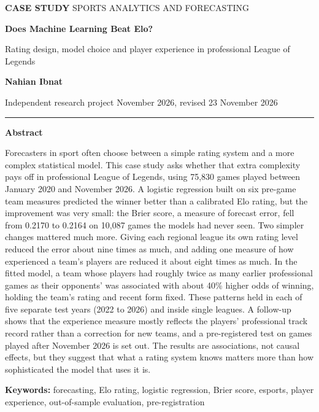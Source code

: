 \documentclass[12pt,a4paper]{article}
\newcommand{\keybox}[2]{%
  \par\noindent\colorbox{boxbg}{\parbox{\dimexpr\linewidth-2\fboxsep}{\vspace{0.3em}%
  {\sffamily\small\bfseries\color{accent}#1}\par\vspace{0.2em}\small #2\vspace{0.3em}}}\par}
\begin{document}
\thispagestyle{empty}
{\sffamily\small\color{red}\textbf{CASE STUDY} \textbar{} SPORTS ANALYTICS AND FORECASTING}\par
\vspace{0.6em}
{\LARGE\bfseries\color{ink} Does Machine Learning Beat Elo?\par}
\vspace{0.3em}
{\Large\color{quiet} Rating design, model choice and player experience in professional League of Legends\par}
\vspace{1em}
{\sffamily\normalsize\textbf{Nahian Ibnat}}\par
{\sffamily\small\color{quiet} Independent research project \textbar{} November 2026, revised 23 November 2026}\par
\vspace{0.8em}
{\color{rule}\rule{\linewidth}{0.6pt}}

\keybox{Abstract}{%
Forecasters in sport often choose between a simple rating system and a more complex statistical model. This case study asks whether that extra complexity pays off in professional League of Legends, using 75,830 games played between January 2020 and November 2026. A logistic regression built on six pre-game team measures predicted the winner better than a calibrated Elo rating, but the improvement was very small: the Brier score, a measure of forecast error, fell from 0.2170 to 0.2164 on 10,087 games the models had never seen. Two simpler changes mattered much more. Giving each regional league its own rating level reduced the error about nine times as much, and adding one measure of how experienced a team's players are reduced it about eight times as much. In the fitted model, a team whose players had roughly twice as many earlier professional games as their opponents' was associated with about 40\% higher odds of winning, holding the team's rating and recent form fixed. These patterns held in each of five separate test years (2022 to 2026) and inside single leagues. A follow-up shows that the experience measure mostly reflects the players' professional track record rather than a correction for new teams, and a pre-registered test on games played after November 2026 is set out. The results are associations, not causal effects, but they suggest that what a rating system knows matters more than how sophisticated the model that uses it is.}

\vspace{0.5em}
{\small\textbf{Keywords:} forecasting, Elo rating, logistic regression, Brier score, esports, player experience, out-of-sample evaluation, pre-registration}
\end{document}
